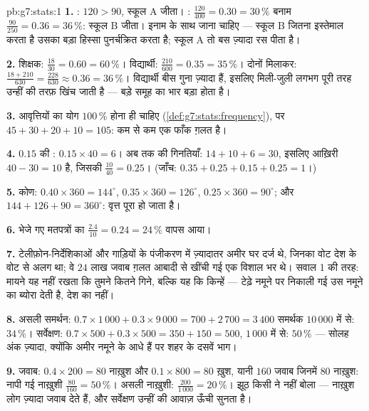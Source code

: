 \begin{solution}{pb:g7:stats:1}
\textbf{1.} : $120 > 90$, स्कूल A जीता। :
$\frac{120}{400} = 0.30 = 30\,\%$ बनाम
$\frac{90}{250} = 0.36 = 36\,\%$: स्कूल B जीता। इनाम  के
साथ जाना चाहिए --- स्कूल B जितना इस्तेमाल करता है उसका बड़ा हिस्सा
पुनर्चक्रित करता है; स्कूल A तो बस ज़्यादा रस पीता है।

\textbf{2.} शिक्षक: $\frac{18}{30} = 0.60 = 60\,\%$।
विद्यार्थी: $\frac{210}{600} = 0.35 = 35\,\%$। दोनों मिलाकर:
$\frac{18 + 210}{630} = \frac{228}{630} \approx 0.36 = 36\,\%$।
विद्यार्थी बीस गुना ज़्यादा हैं, इसलिए मिली-जुली  लगभग
पूरी तरह उन्हीं की तरफ़ खिंच जाती है --- बड़े समूह का भार बड़ा
होता है।

\textbf{3.} आवृत्तियों का योग $100\,\%$ होना ही चाहिए
(\cref{def:g7:stats:frequency}), पर
$45 + 30 + 20 + 10 = 105$: कम से कम एक फाँक ग़लत है।

\textbf{4.}  $0.15$ की : $0.15 \times 40 = 6$। अब तक
की गिनतियाँ: $14 + 10 + 6 = 30$, इसलिए आख़िरी 
$40 - 30 = 10$ है, जिसकी  $\frac{10}{40} = 0.25$। (जाँच:
$0.35 + 0.25 + 0.15 + 0.25 = 1$।)

\textbf{5.} कोण: $0.40 \times 360 = 144^\circ$,
$0.35 \times 360 = 126^\circ$, $0.25 \times 360 = 90^\circ$;
और $144 + 126 + 90 = 360^\circ$: वृत्त पूरा हो जाता है।

\textbf{6.} भेजे गए मतपत्रों का $\frac{2.4}{10} = 0.24 = 24\,\%$
वापस आया।

\textbf{7.} टेलीफ़ोन-निर्देशिकाओं और गाड़ियों के पंजीकरण में
ज़्यादातर अमीर घर दर्ज थे, जिनका वोट देश के वोट से अलग था; वे
$24$ लाख जवाब ग़लत आबादी से खींची गई एक विशाल  भर थे। सवाल 1
की तरह: मायने यह नहीं रखता कि तुमने कितने गिने, बल्कि यह कि
किन्हें --- टेढ़े नमूने पर निकाली गई  उस नमूने का ब्योरा
देती है, देश का नहीं।

\textbf{8.} असली समर्थन:
$0.7 \times 1\,000 + 0.3 \times 9\,000 = 700 + 2\,700 = 3\,400$
समर्थक $10\,000$ में से: $34\,\%$। सर्वेक्षण:
$0.7 \times 500 + 0.3 \times 500 = 350 + 150 = 500$, $1\,000$ में
से: $50\,\%$ --- सोलह अंक ज़्यादा, क्योंकि अमीर नमूने के आधे हैं
पर शहर के दसवें भाग।

\textbf{9.} जवाब: $0.4 \times 200 = 80$ नाख़ुश और
$0.1 \times 800 = 80$ ख़ुश, यानी $160$ जवाब जिनमें $80$ नाख़ुश:
नापी गई नाख़ुशी $\frac{80}{160} = 50\,\%$। असली नाख़ुशी:
$\frac{200}{1\,000} = 20\,\%$। झूठ किसी ने नहीं बोला --- नाख़ुश
लोग ज़्यादा जवाब देते हैं, और सर्वेक्षण उन्हीं की आवाज़ ऊँची
सुनता है।


\end{solution}
